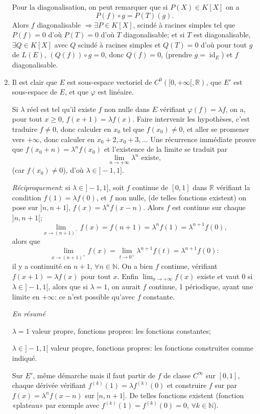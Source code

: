 \begin{enumerate}[label=\arabic*.,leftmargin=2.2em,itemsep=1.1em]
Pour la diagonalisation, on peut remarquer que si $P(X)\in K[X]$ on a
\[
P(f)\circ g=P(T)(g).
\]
Alors $f$ diagonalisable $\Rightarrow\exists P\in K[X]$, scindé à racines simples tel que $P(f)=0$ d'où $P(T)=0$ d'où $T$ diagonalisable; et si $T$ est diagonalisable, $\exists Q\in K[X]$ avec $Q$ scindé à racines simples et $Q(T)=0$ d'où pour tout $g$ de $L(E)$, $(Q(f))\circ g=0$, donc $Q(f)=0$, (prendre $g=\operatorname{id}_E$) et $f$ diagonalisable.

\item Il est clair que $E$ est sous-espace vectoriel de $C^0([0,+\infty[,\mathbb R)$, que $E'$ est sous-espace de $E$, et que $\varphi$ est linéaire.

Si $\lambda$ réel est tel qu'il existe $f$ non nulle dans $E$ vérifiant $\varphi(f)=\lambda f$, on a, pour tout $x\ge0$, $f(x+1)=\lambda f(x)$. Faire intervenir les hypothèses, c'est traduire $f\ne0$, donc calculer en $x_0$ tel que $f(x_0)\ne0$, et aller se promener vers $+\infty$, donc calculer en $x_0+2,x_0+3,\ldots$ Une récurrence immédiate prouve que $f(x_0+n)=\lambda^n f(x_0)$ et l'existence de la limite se traduit par
\[
\lim_{n\to+\infty}\lambda^n\text{ existe},
\]
(car $f(x_0)\ne0$), d'où $\lambda\in]-1,1]$.

\emph{Réciproquement}: si $\lambda\in]-1,1]$, soit $f$ continue de $[0,1]$ dans $\mathbb R$ vérifiant la condition $f(1)=\lambda f(0)$, et $f$ non nulle, (de telles fonctions existent) on pose sur $]n,n+1]$, $f(x)=\lambda^n f(x-n)$. Alors $f$ est continue sur chaque $]n,n+1[$;
\[
\lim_{x\to(n+1)^-}f(x)=f(n+1)=\lambda^nf(1)=\lambda^{n+1}f(0),
\]
alors que
\[
\lim_{x\to(n+1)^+}f(x)=\lim_{t\to0^+}\lambda^{n+1}f(t)=\lambda^{n+1}f(0):
\]
il y a continuité en $n+1$, $\forall n\in\mathbb N$. On a bien $f$ continue, vérifiant $f(x+1)=\lambda f(x)$ pour tout $x$. Enfin $\lim_{x\to+\infty}f(x)$ existe et vaut 0 si $\lambda\in]-1,1[$, alors que si $\lambda=1$, on aurait $f$ continue, 1 périodique, ayant une limite en $+\infty$: ce n'est possible qu'avec $f$ constante.

\emph{En résumé}

$\lambda=1$ valeur propre, fonctions propres: les fonctions constantes;

$\lambda\in]-1,1[$ valeur propre, fonctions propres: les fonctions construites comme indiqué.

Sur $E'$, même démarche mais il faut partir de $f$ de classe $C^\infty$ sur $[0,1]$, chaque dérivée vérifiant $f^{(k)}(1)=\lambda f^{(k)}(0)$ et construire $f$ sur \BellaCorrectionNote{$[0,+\infty[$}{$\mathbb R$}{La fonction de $E'$ est définie sur $[0,+\infty[$, et la construction par intervalles $]n,n+1]$, $n\in\mathbb N$, ne définit que ce demi-axe.} par $f(x)=\lambda^nf(x-n)$ sur $]n,n+1]$. De telles fonctions existent (fonction «plateau» par exemple avec $f^{(k)}(1)=f^{(k)}(0)=0$, $\forall k\in\mathbb N$).


\end{enumerate}
